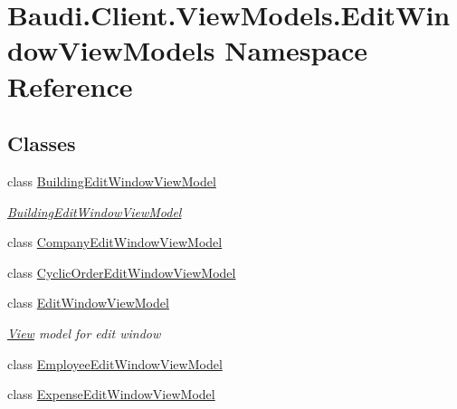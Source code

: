 \hypertarget{namespace_baudi_1_1_client_1_1_view_models_1_1_edit_window_view_models}{}\section{Baudi.\+Client.\+View\+Models.\+Edit\+Window\+View\+Models Namespace Reference}
\label{namespace_baudi_1_1_client_1_1_view_models_1_1_edit_window_view_models}
\subsection*{Classes}
\begin{DoxyCompactItemize}
\item 
class \hyperlink{class_baudi_1_1_client_1_1_view_models_1_1_edit_window_view_models_1_1_building_edit_window_view_model}{Building\+Edit\+Window\+View\+Model}
\begin{DoxyCompactList}\small\item\em \hyperlink{class_baudi_1_1_client_1_1_view_models_1_1_edit_window_view_models_1_1_building_edit_window_view_model}{Building\+Edit\+Window\+View\+Model} \end{DoxyCompactList}\item 
class \hyperlink{class_baudi_1_1_client_1_1_view_models_1_1_edit_window_view_models_1_1_company_edit_window_view_model}{Company\+Edit\+Window\+View\+Model}
\item 
class \hyperlink{class_baudi_1_1_client_1_1_view_models_1_1_edit_window_view_models_1_1_cyclic_order_edit_window_view_model}{Cyclic\+Order\+Edit\+Window\+View\+Model}
\item 
class \hyperlink{class_baudi_1_1_client_1_1_view_models_1_1_edit_window_view_models_1_1_edit_window_view_model}{Edit\+Window\+View\+Model}
\begin{DoxyCompactList}\small\item\em \hyperlink{namespace_baudi_1_1_client_1_1_view}{View} model for edit window \end{DoxyCompactList}\item 
class \hyperlink{class_baudi_1_1_client_1_1_view_models_1_1_edit_window_view_models_1_1_employee_edit_window_view_model}{Employee\+Edit\+Window\+View\+Model}
\item 
class \hyperlink{class_baudi_1_1_client_1_1_view_models_1_1_edit_window_view_models_1_1_expense_edit_window_view_model}{Expense\+Edit\+Window\+View\+Model}
\item 

\end{DoxyCompactItemize}
